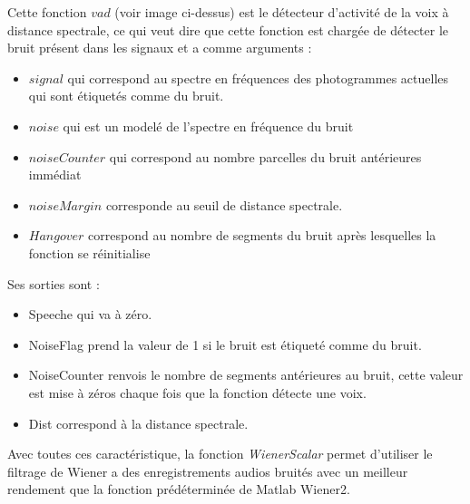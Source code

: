 \documentclass[conference,onecolumn]{IEEEtran}
\begin{document}
Cette fonction $vad$ (voir image ci-dessus) est le détecteur d’activité de la voix à distance spectrale, ce qui veut dire que cette fonction est chargée de détecter le bruit présent dans les signaux et a comme arguments :
\begin{itemize}
    \item $signal$ qui correspond au spectre en fréquences des photogrammes actuelles qui sont étiquetés comme du bruit. 
\item $noise$ qui est un modelé de l’spectre en fréquence du bruit
\item $noiseCounter$ qui correspond au nombre parcelles du bruit antérieures immédiat
\item $noiseMargin$ corresponde au seuil de distance spectrale.
\item  $Hangover$ correspond au nombre de segments du bruit après lesquelles la fonction se réinitialise
\end{itemize}
Ses sorties sont :
\begin{itemize}
    \item  Speeche qui va à zéro.
\item NoiseFlag prend la valeur de 1 si le bruit est étiqueté comme du bruit.
\item NoiseCounter renvois le nombre de segments antérieures au bruit, cette valeur est mise à zéros chaque fois que la fonction détecte une voix. 
\item Dist correspond à la distance spectrale.
\end{itemize}
\medskip 
Avec toutes ces caractéristique, la fonction \textit{WienerScalar} permet d’utiliser le filtrage de Wiener a des enregistrements audios bruités avec un meilleur rendement que la fonction prédéterminée de Matlab Wiener2.
\end{document}
